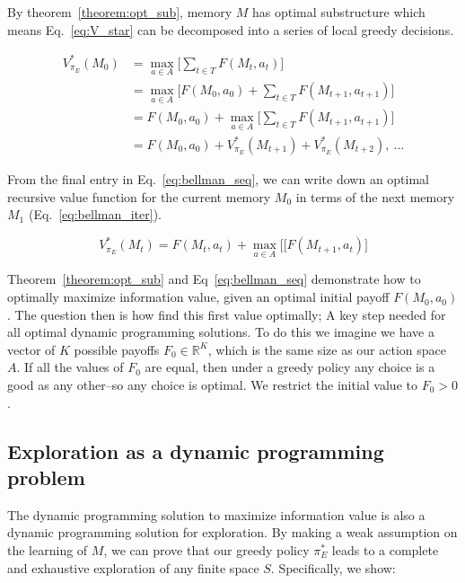 \documentclass[9pt,twocolumn,twoside]{pnas-new}
\begin{document}
By theorem~\ref{theorem:opt_sub}, memory $M$ has optimal substructure which means Eq.~\ref{eq:V_star} can be decomposed into a series of local greedy decisions.

\begin{equation} \label{eq:bellman_seq}
    \begin{split}
        V^*_{\pi_E}(M_0) &= \max_{a \in A} \Big [\sum_{t \in T} F(M_t, a_t)\Big ]\\
                         &= \max_{a \in A} \Big [F(M_0, a_0) + \sum_{t \in T} F(M_{t+1}, a_{t+1})\Big ]\\
                         &= F(M_0, a_0) + \max_{a \in A} \Big [\sum_{t \in T} F(M_{t+1}, a_{t+1}) \Big ]\\
                         &= F(M_0, a_0) + V^*_{\pi_E}(M_{t+1}) + V^*_{\pi_E}(M_{t+2}),\ \ldots
    \end{split}
\end{equation}

From the final entry in Eq.~\ref{eq:bellman_seq}, we can write down an optimal recursive value function for the current memory $M_0$ in terms of the next memory $M_1$ (Eq.~\ref{eq:bellman_iter}).

\begin{equation} \label{eq:bellman_iter}
    V^*_{\pi_E}(M_{t}) = F(M_{t}, a_{t}) + \max_{a \in A} \Big [ [F(M_{t+1}, a_t) \Big ]
\end{equation}
    
Theorem~\ref{theorem:opt_sub} and Eq~\ref{eq:bellman_seq} demonstrate how to optimally maximize information value, given an optimal initial payoff $F(M_0, a_0)$. The question then is how find this first value optimally; A key step needed for all optimal dynamic programming solutions. To do this we imagine we have a vector of $K$ possible payoffs $F_0 \in \mathbb{R}^K$, which is the same size as our action space $A$. If all the values of $F_0$ are equal, then under a greedy policy any choice is a good as any other--so any choice is optimal. We restrict the initial value to $F_0 > 0$.  %

\subsection*{Exploration as a dynamic programming problem}
The dynamic programming solution to maximize information value is also a dynamic programming solution for exploration. By making a weak assumption on the learning of $M$, we can prove that our greedy policy $\pi^*_E$ leads to a complete and exhaustive exploration of any finite space $S$. Specifically, we show:
\end{document}
